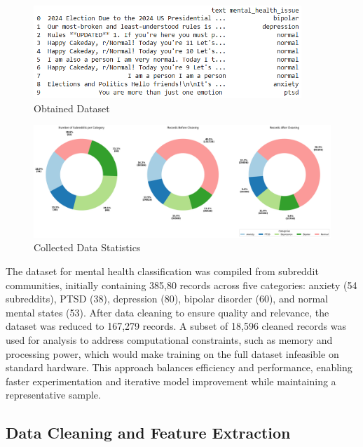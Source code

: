 \begin{figure}[h!]  
    \centering
    \includegraphics[width=0.9\textwidth]{Images/Dataset.png}  
    \caption{Obtained Dataset}
    \label{LSTMROC711}  %
\end{figure}



\begin{figure}[h!]  
    \centering
    \includegraphics[width=1.0\textwidth]{Images/Data Collection Graph.png}  
    \caption{Collected Data Statistics}
    \label{LSTMROC7uyiut11}  %
\end{figure}

\noindent
The dataset for mental health classification was compiled from subreddit communities, initially containing 385,80 records across five categories: anxiety (54 subreddits), PTSD (38), depression (80), bipolar disorder (60), and normal mental states (53). After data cleaning to ensure quality and relevance, the dataset was reduced to 167,279 records. A subset of 18,596 cleaned records was used for analysis to address computational constraints, such as memory and processing power, which would make training on the full dataset infeasible on standard hardware. This approach balances efficiency and performance, enabling faster experimentation and iterative model improvement while maintaining a representative sample.





\subsection{Data Cleaning and Feature Extraction}

